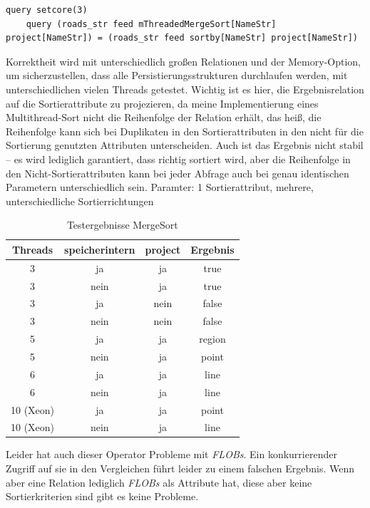\documentclass[a4paper,12pt,twoside]{article}
\newcommand{\Fb}[1]{\textit{#1}} %
\begin{document}
\begin{minipage}{\linewidth}
	\begin{lstlisting}[caption={Beispiel Testqueries für den Sort-Operator}, label=list:testsort]
	query setcore(3)
	query (roads_str feed mThreadedMergeSort[NameStr] project[NameStr]) = (roads_str feed sortby[NameStr] project[NameStr]) 
	\end{lstlisting}
\end{minipage}

Korrektheit wird mit unterschiedlich großen Relationen und der Memory-Option, um sicherzustellen, dass alle Persistierungsstrukturen durchlaufen werden, mit unterschiedlichen vielen Threads getestet. Wichtig ist es hier, die Ergebnisrelation auf die Sortierattribute zu projezieren, da meine Implementierung eines Multithread-Sort nicht die Reihenfolge der Relation erhält, das heiß, die Reihenfolge kann sich bei Duplikaten in den Sortierattributen in den nicht für die Sortierung genutzten Attributen unterscheiden. Auch ist das Ergebnis nicht stabil -- es wird lediglich garantiert, dass richtig sortiert wird, aber die Reihenfolge in den Nicht-Sortierattributen kann bei jeder Abfrage auch bei genau identischen Parametern unterschiedlich sein.
Paramter: 1 Sortierattribut, mehrere, unterschiedliche Sortierrichtungen

\begin{table}
	\centering
\begin{tabular}{|c|c|c|c|}
	\hline 
	Threads & speicherintern & project & Ergebnis \\ 
	\hline 
	3 & ja & ja & true \\ 
	\hline 
	3 & nein & ja & true \\ 
	\hline 
	3 & ja & nein & false \\ 
	\hline 
	3 & nein & nein & false \\ 
	\hline
	5 & ja & ja & region \\ 
	\hline 
	5 & nein & ja  & point \\ 
	\hline 
	6 & ja & ja & line \\ 
	\hline
	6 & nein & ja & line \\ 
	\hline
	10 (Xeon) & ja & ja  & point \\ 
	\hline 
	10 (Xeon) & nein & ja & line \\ 
	\hline 
\end{tabular}
\caption{\label{tab:testSort}Testergebnisse MergeSort}
\end{table}


Leider hat auch dieser Operator Probleme mit \Fb{FLOBs}. Ein konkurrierender Zugriff auf sie in den Vergleichen führt leider zu einem falschen Ergebnis. Wenn aber eine Relation lediglich \Fb{FLOBs} als Attribute hat, diese aber keine Sortierkriterien sind gibt es keine Probleme.
\end{document}
